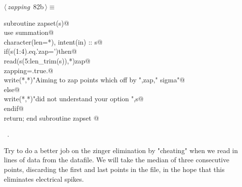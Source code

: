 \documentclass[10pt,a4paper,notitlepage]{article}
\begin{document}
\begin{flushleft} \small
\begin{minipage}{\linewidth}\label{scrap98}\raggedright\small
{} $\langle\,${\it zapping}\nobreak\ {\footnotesize {82b}}$\,\rangle\equiv$
\vspace{-1ex}
\begin{list}{}{} \item
\mbox{}\verb@      subroutine zapset(s)@\\
\mbox{}\verb@      use summation@\\
\mbox{}\verb@      character(len=*), intent(in) :: s@\\
\mbox{}\verb@      if(s(1:4).eq.'zap=')then@\\
\mbox{}\verb@        read(s(5:len_trim(s)),*)zap@\\
\mbox{}\verb@        zapping=.true.@\\
\mbox{}\verb@        write(*,*)"Aiming to zap points which off by ",zap," sigma"@\\
\mbox{}\verb@      else@\\
\mbox{}\verb@        write(*,*)"did not understand your option ",s@\\
\mbox{}\verb@      endif@\\
\mbox{}\verb@      return; end subroutine zapset                                        @{\NWsep}
\end{list}
\vspace{-1.5ex}
\footnotesize
\begin{list}{}{\setlength{\itemsep}{-\parsep}\setlength{\itemindent}{-\leftmargin}}
\item \NWtxtMacroRefIn\ .

\item{}
\end{list}
\end{minipage}\vspace{4ex}
\end{flushleft}
Try to do a better job on the zinger elimination by "cheating" when we 
read in lines of data from the datafile. We will take the median of three 
consecutive points, discarding the first and last points in the file, in
the hope that this eliminates electrical spikes.
\end{document}
